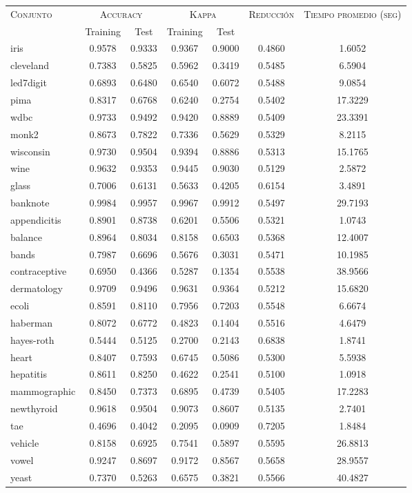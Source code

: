\begin{table}[]
\centering
\begin{tabular}{l c c c c c c}
\hline
\multirow{2}{*}{\textsc{Conjunto}}
	& \multicolumn{2}{c}{\textsc{Accuracy}}
	& \multicolumn{2}{c}{\textsc{Kappa}}
	& \textsc{Reducción}
	& \textsc{Tiempo promedio (seg)} \\
	& Training & Test
	& Training & Test \\ 
\hline
\hline

iris & 0.9578 & 0.9333 & 0.9367 & 0.9000 & 0.4860 & 1.6052 \\
cleveland & 0.7383 & 0.5825 & 0.5962 & 0.3419 & 0.5485 & 6.5904 \\
led7digit & 0.6893 & 0.6480 & 0.6540 & 0.6072 & 0.5488 & 9.0854 \\
pima & 0.8317 & 0.6768 & 0.6240 & 0.2754 & 0.5402 & 17.3229 \\
wdbc & 0.9733 & 0.9492 & 0.9420 & 0.8889 & 0.5409 & 23.3391 \\
monk2 & 0.8673 & 0.7822 & 0.7336 & 0.5629 & 0.5329 & 8.2115 \\
wisconsin & 0.9730 & 0.9504 & 0.9394 & 0.8886 & 0.5313 & 15.1765 \\
wine & 0.9632 & 0.9353 & 0.9445 & 0.9030 & 0.5129 & 2.5872 \\
glass & 0.7006 & 0.6131 & 0.5633 & 0.4205 & 0.6154 & 3.4891 \\
banknote & 0.9984 & 0.9957 & 0.9967 & 0.9912 & 0.5497 & 29.7193 \\
appendicitis & 0.8901 & 0.8738 & 0.6201 & 0.5506 & 0.5321 & 1.0743 \\
balance & 0.8964 & 0.8034 & 0.8158 & 0.6503 & 0.5368 & 12.4007 \\
bands & 0.7987 & 0.6696 & 0.5676 & 0.3031 & 0.5471 & 10.1985 \\ 
contraceptive & 0.6950 & 0.4366 & 0.5287 & 0.1354 & 0.5538 & 38.9566 \\
dermatology & 0.9709 & 0.9496 & 0.9631 & 0.9364 & 0.5212 & 15.6820 \\
ecoli & 0.8591 & 0.8110 & 0.7956 & 0.7203 & 0.5548 & 6.6674 \\
haberman & 0.8072 & 0.6772 & 0.4823 & 0.1404 & 0.5516 & 4.6479 \\
hayes-roth & 0.5444 & 0.5125 & 0.2700 & 0.2143 & 0.6838 & 1.8741 \\
heart & 0.8407 & 0.7593 & 0.6745 & 0.5086 & 0.5300 & 5.5938 \\
hepatitis & 0.8611 & 0.8250 & 0.4622 & 0.2541 & 0.5100 & 1.0918 \\
mammographic & 0.8450 & 0.7373 & 0.6895 & 0.4739 & 0.5405 & 17.2283 \\
newthyroid & 0.9618 & 0.9504 & 0.9073 & 0.8607 & 0.5135 & 2.7401 \\
tae & 0.4696 & 0.4042 & 0.2095 & 0.0909 & 0.7205 & 1.8484 \\
vehicle & 0.8158 & 0.6925 & 0.7541 & 0.5897 & 0.5595 & 26.8813 \\
vowel & 0.9247 & 0.8697 & 0.9172 & 0.8567 & 0.5658 & 28.9557 \\
yeast & 0.7370 & 0.5263 & 0.6575 & 0.3821 & 0.5566 & 40.4827 \\


\end{tabular}
\end{table}
